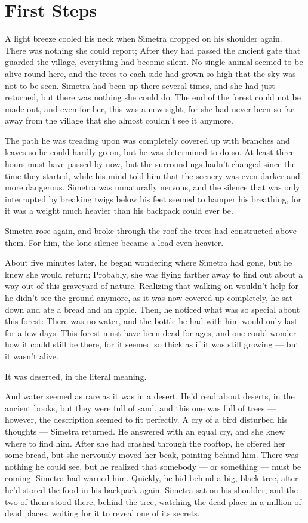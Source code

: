 \chapter{First Steps}
\label{cha:first-steps}
A light breeze cooled his neck when Simetra dropped on his shoulder again. There was nothing she could report; After they had passed the ancient gate that guarded the village, everything had become silent. No single animal seemed to be alive round here, and the trees to each side had grown so high that the sky was not to be seen. 
Simetra had been up there several times, and she had just returned, but there was nothing she could do. The end of the forest could not be made out, and even for her, this was a new sight, for she had never been so far away from the village that she almost couldn't see it anymore. 

The path he was treading upon was completely covered up with branches and leaves so he could hardly go on, but he was determined to do so. At least three hours must have passed by now, but the surroundings hadn't changed since the time they started, while his mind told him that the scenery was even darker and more dangerous. Simetra was unnaturally nervous, and the silence that was only interrupted by breaking twigs below his feet seemed to hamper his breathing, for it was a weight much heavier than his backpack could ever be.

Simetra rose again, and broke through the roof the trees had constructed above them. For him, the lone silence became a load even heavier.

About five minutes later, he began wondering where Simetra had gone, but he knew she would return; Probably, she was flying farther away to find out about a way out of this graveyard of nature. Realizing that walking on wouldn't help for he didn't see the ground anymore, as it was now covered up completely, he sat down and ate a bread and an apple. Then, he noticed what was so special about this forest: There was no water, and the bottle he had with him would only last for a few days. This forest must have been dead for ages, and one could wonder how it could still be there, for it seemed so thick as if it was still growing --- but it wasn't alive. 

It was deserted, in the literal meaning. 

And water seemed as rare as it was in a desert. He'd read about deserts, in the ancient books, but they were full of sand, and this one was full of trees --- however, the description seemed to fit perfectly. 
A cry of a bird disturbed his thoughts --- Simetra returned. He answered with an equal cry, and she knew where to find him. After she had crashed through the rooftop, he offered her some bread, but she nervously moved her beak, pointing behind him. There was nothing he could see, but he realized that somebody --- or something --- must be coming. Simetra had warned him. 
Quickly, he hid behind a big, black tree, after he'd stored the food in his backpack again. Simetra sat on his shoulder, and the two of them stood there, behind the tree, watching the dead place in a million of dead places, waiting for it to reveal one of its secrets.

